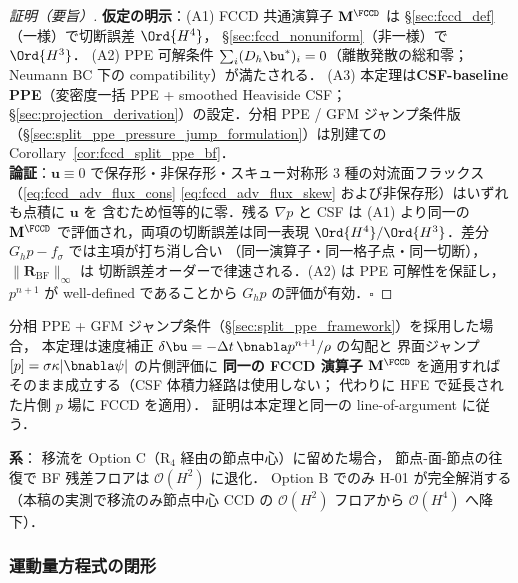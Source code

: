 \begin{proof}[証明（要旨）]
\textbf{仮定の明示}：(A1) FCCD 共通演算子 $\mathbf{M}^{\FCCD}$ は
\S\ref{sec:fccd_def}（一様）で切断誤差 $\Ord{H^4}$，
\S\ref{sec:fccd_nonuniform}（非一様）で $\Ord{H^3}$．
(A2) PPE 可解条件 $\sum_i (D_h\bu^*)_i = 0$（離散発散の総和零；
Neumann BC 下の compatibility）が満たされる．
(A3) 本定理は\textbf{CSF-baseline PPE}（変密度一括 PPE + smoothed Heaviside
CSF；§\ref{sec:projection_derivation}）の設定．分相 PPE / GFM ジャンプ条件版
（§\ref{sec:split_ppe_pressure_jump_formulation}）は別建ての
Corollary~\ref{cor:fccd_split_ppe_bf}．\\
\textbf{論証}：$\mathbf{u}\equiv 0$ で保存形・非保存形・スキュー対称形
3 種の対流面フラックス（\eqref{eq:fccd_adv_flux_cons}
\eqref{eq:fccd_adv_flux_skew} および非保存形）はいずれも点積に $\mathbf{u}$ を
含むため恒等的に零．残る $\nabla p$ と CSF は (A1) より同一の
$\mathbf{M}^{\FCCD}$ で評価され，両項の切断誤差は同一表現
$\Ord{H^4}/\Ord{H^3}$．差分 $G_h p - f_\sigma$ では主項が打ち消し合い
（同一演算子・同一格子点・同一切断），$\|\mathbf{R}_\text{BF}\|_\infty$ は
切断誤差オーダーで律速される．(A2) は PPE 可解性を保証し，$p^{n+1}$ が
well-defined であることから $G_h p$ の評価が有効．$\square$
\end{proof}

\begin{corollary}
\label{cor:fccd_split_ppe_bf}
分相 PPE + GFM ジャンプ条件（§\ref{sec:split_ppe_framework}）を採用した場合，
本定理は速度補正 $\delta\bu = -\Delta t\,\bnabla p^{n+1}/\rho$ の勾配と
界面ジャンプ $[p]=\sigma\kappa|\bnabla\psi|$ の片側評価に
\textbf{同一の FCCD 演算子 $\mathbf{M}^{\FCCD}$} を適用すれば
そのまま成立する（CSF 体積力経路は使用しない；
代わりに HFE で延長された片側 $p$ 場に FCCD を適用）．
証明は本定理と同一の line-of-argument に従う．
\end{corollary}

\noindent\textbf{系}：
移流を Option C（R$_4$ 経由の節点中心）に留めた場合，
節点-面-節点の往復で BF 残差フロアは $\mathcal{O}(H^2)$ に退化．
Option B でのみ H-01 が完全解消する（本稿の実測で移流のみ節点中心 CCD の
$\mathcal{O}(H^2)$ フロアから $\mathcal{O}(H^4)$ へ降下）．

\subsubsection{運動量方程式の閉形}
\label{sec:fccd_adv_closure}

